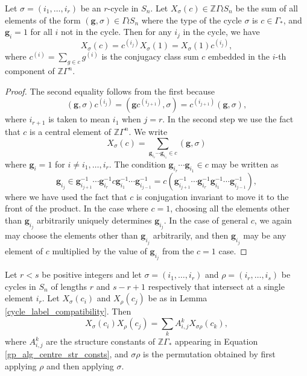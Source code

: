 \begin{lemma} \label{cycle_label_compatibility}
Let $\sigma = (i_1, \ldots, i_r)$ be an $r$-cycle in $S_n$. Let $X_\sigma(c) \in \mathbb{Z}\Gamma \wr S_n$ be the sum of all elements of the form $(\mathbf{g}, \sigma) \in \Gamma \wr S_n$ where the type of the cycle $\sigma$ is $c \in \Gamma_*$, and $\mathbf{g}_i = 1$ for all $i$ not in the cycle. Then for any $i_j$ in the cycle, we have
\[
X_\sigma(c) = c^{(i_j)}X_\sigma(1) = X_\sigma(1) c^{(i_j)},
\]
where $c^{(i)} = \sum_{g \in c} g^{(i)}$ is the conjugacy class sum $c$ embedded in the $i$-th component of $\mathbb{Z}\Gamma^n$. 
\end{lemma}
\begin{proof}
The second equality follows from the first because
\[
(\mathbf{g}, \sigma) c^{(i_j)}  = (\mathbf{g}c^{(i_{j+1})}, \sigma) = c^{(i_{j+1})}(\mathbf{g}, \sigma),
\]
where $i_{r+1}$ is taken to mean $i_1$ when $j=r$. In the second step we use the fact that $c$ is a central element of $\mathbb{Z}\Gamma^n$. We write
\[
X_\sigma(c) = \sum_{\mathbf{g}_{i_r} \cdots \mathbf{g}_{i_1} \in c} (\mathbf{g}, \sigma)
\]
where $\mathbf{g}_i = 1$ for $i \neq i_1, \ldots, i_r$. The condition $\mathbf{g}_{i_r} \cdots \mathbf{g}_{i_1} \in c$ may be written as
\[
\mathbf{g}_{i_j} \in \mathbf{g}_{i_{j+1}}^{-1} \cdots \mathbf{g}_{i_{r}}^{-1}c\mathbf{g}_{i_1}^{-1} \cdots \mathbf{g}_{i_{j-1}}^{-1} = c (\mathbf{g}_{i_{j+1}}^{-1} \cdots \mathbf{g}_{i_{r}}^{-1}\mathbf{g}_{i_1}^{-1} \cdots \mathbf{g}_{i_{j-1}}^{-1}),
\]
where we have used the fact that $c$ is conjugation invariant to move it to the front of the product. In the case where $c=1$, choosing all the elements other than $\mathbf{g}_{i_j}$ arbitrarily uniquely determines $\mathbf{g}_{i_j}$. In the case of general $c$, we again may choose the elements other than $\mathbf{g}_{i_j}$ arbitrarily, and then $\mathbf{g}_{i_j}$ may be any element of $c$ multiplied by the value of $\mathbf{g}_{i_j}$ from the $c=1$ case.
\end{proof}
\begin{lemma} \label{cycle_label_product}
Let $r<s$ be positive integers and let $\sigma = (i_1, \ldots, i_r)$ and $\rho = (i_r, \ldots, i_s)$ be cycles in $S_n$ of lengths $r$ and $s-r+1$ respectively that intersect at a single element $i_r$. Let $X_\sigma(c_i)$ and $X_\rho(c_j)$ be as in Lemma \ref{cycle_label_compatibility}. Then
\[
X_\sigma(c_i) X_\rho(c_j) = \sum_{k} A_{i,j}^k X_{\sigma\rho}(c_k),
\]
where $A_{i,j}^k$ are the structure constants of $\mathbb{Z}\Gamma_*$ appearing in Equation \eqref{gp_alg_centre_str_consts}, and $\sigma \rho$ is the permutation obtained by first applying $\rho$ and then applying $\sigma$.
\end{lemma}
